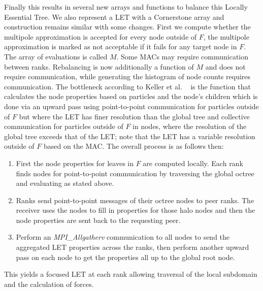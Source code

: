 Finally this results in several new arrays and functions to balance this Locally Essential Tree. We also represent a LET with a Cornerstone array and construction remains similar with some changes. First we compute whether the multipole approximation is accepted for every node outside of $F$, the multipole approximation is marked as not acceptable if it fails for any target node in $F$. The array of evaluations is called $M$. Some MACs may require communication between ranks. Rebalancing is now additionally a function of $M$ and does not require communication, while generating the histogram of node counts requires communication. The bottleneck according to Keller et al. ~\cite{cornerstone} is the function that calculates the node properties based on particles and the node's children which is done via an upward pass using point-to-point communication for particles outside of $F$ but where the LET has finer resolution than the global tree and collective communication for particles outside of $F$ in nodes, where the resolution of the global tree exceeds that of the LET; note that the LET has a variable resolution outside of $F$ based on the MAC. The overall process is as follows then:
\begin{enumerate}
    \item First the node properties for leaves in $F$ are computed locally. Each rank finds nodes for point-to-point communication by traversing the global octree and evaluating as stated above. 
    \item Ranks send point-to-point messages of their octree nodes to peer ranks. The receiver uses the nodes to fill in properties for those halo nodes and then the node properties are sent back to the requesting peer.
    \item Perform an \textit{MPI\_Allgatherv} communication to all nodes to send the aggregated LET properties across the ranks, then perform another upward pass on each node to get the properties all up to the global root node.
\end{enumerate}

This yields a focused LET at each rank allowing traversal of the local subdomain and the calculation of forces. 
